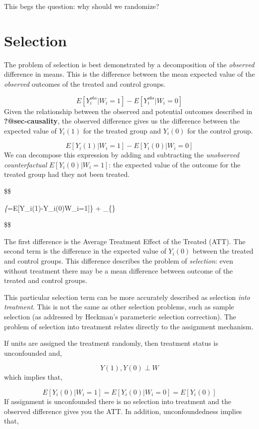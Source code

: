 \documentclass[
  letterpaper,
  DIV=11,
  numbers=noendperiod]{scrreprt}
\theoremstyle{definition}
\theoremstyle{remark}
\begin{document}
This begs the question: why should we randomize?

\section{Selection}\label{selection}

The problem of selection is best demonstrated by a decomposition of the
\emph{observed} difference in means. This is the difference between the
mean expected value of the \emph{observed} outcomes of the treated and
control groups.

\[
E[Y_i^{obs}|W_i=1] - E[Y_i^{obs}|W_i=0]
\] Given the relationship between the observed and potential outcomes
described in \textbf{?@sec-causality}, the observed difference gives us
the difference between the expected value of \(Y_i(1)\) for the treated
group and \(Y_i(0)\) for the control group.

\[
E[Y_i(1)|W_i=1]- E[Y_i(0)|W_i=0]
\] We can decompose this expression by adding and subtracting the
\emph{unobserved counterfactual} \(E[Y_i(0)|W_i=1]\): the expected value
of the outcome for the treated group had they not been treated.

\$\$

\emph{\{}=E{[}Y\_i(1)-Y\_i(0)\textbar W\_i=1{]}\}
+ \_\{\}

\$\$

The first difference is the Average Treatment Effect of the Treated
(ATT). The second term is the difference in the expected value of
\(Y_i(0)\) between the treated and control groups. This difference
describes the problem of \emph{selection}: even without treatment there
may be a mean difference between outcome of the treated and control
groups.

This particular selection term can be more accurately described as
selection \emph{into treatment}. This is not the same as other selection
problems, such as sample selection (as addressed by Heckman's
parameteric selection correction). The problem of selection into
treatment relates directly to the assignment mechanism.

If units are assigned the treatment randomly, then treatment status is
unconfounded and,

\[
  Y(1),Y(0)\perp W
\] which implies that,

\[
  E[Y_i(0)|W_i=1]=E[Y_i(0)|W_i=0]=E[Y_i(0)]
\] If assignment is unconfounded there is no selection into treatment
and the observed difference gives you the ATT. In addition,
unconfoundedness implies that,
\end{document}
